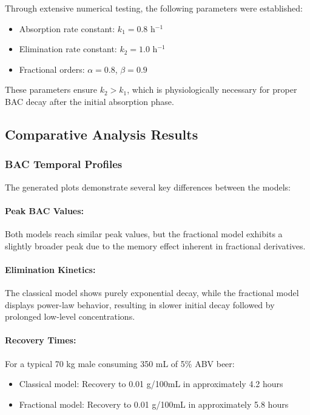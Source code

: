 \documentclass[12pt]{article}
\begin{document}
Through extensive numerical testing, the following parameters were established:
\begin{itemize}
    \item Absorption rate constant: $k_1 = 0.8$ h$^{-1}$
    \item Elimination rate constant: $k_2 = 1.0$ h$^{-1}$
    \item Fractional orders: $\alpha = 0.8$, $\beta = 0.9$
\end{itemize}

These parameters ensure $k_2 > k_1$, which is physiologically necessary for proper BAC decay after the initial absorption phase.

\subsection{Comparative Analysis Results}

\subsubsection{BAC Temporal Profiles}

The generated plots demonstrate several key differences between the models:

\paragraph{Peak BAC Values:} Both models reach similar peak values, but the fractional model exhibits a slightly broader peak due to the memory effect inherent in fractional derivatives.

\paragraph{Elimination Kinetics:} The classical model shows purely exponential decay, while the fractional model displays power-law behavior, resulting in slower initial decay followed by prolonged low-level concentrations.

\paragraph{Recovery Times:} For a typical 70 kg male consuming 350 mL of 5\% ABV beer:
\begin{itemize}
    \item Classical model: Recovery to 0.01 g/100mL in approximately 4.2 hours
    \item Fractional model: Recovery to 0.01 g/100mL in approximately 5.8 hours
\end{itemize}
\end{document}

